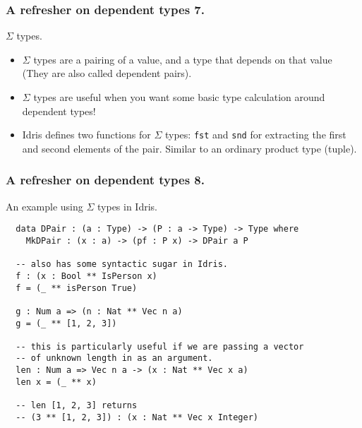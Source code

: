 \documentclass{beamer}
\begin{document}
\begin{frame}[fragile]
  \frametitle{A refresher on dependent types 7.}
  \begin{block}{$\Sigma$ types.}
  \begin{itemize}
    \item $\Sigma$ types are a pairing of a value, and a type that
            depends on that value (They are also called dependent
            pairs).
    \item $\Sigma$ types are useful when you want some basic type
            calculation around dependent types!
    \item Idris defines two functions for $\Sigma$ types:
          \texttt{fst} and \texttt{snd}
          for extracting the first and second elements of the pair.
          Similar to an ordinary product type (tuple).
  \end{itemize}
  \end{block}
\end{frame}

\begin{frame}[fragile]
  \frametitle{A refresher on dependent types 8.}
  \begin{block}{An example using $\Sigma$ types in Idris.}
  \begin{verbatim}
  data DPair : (a : Type) -> (P : a -> Type) -> Type where
    MkDPair : (x : a) -> (pf : P x) -> DPair a P

  -- also has some syntactic sugar in Idris.
  f : (x : Bool ** IsPerson x)
  f = (_ ** isPerson True)

  g : Num a => (n : Nat ** Vec n a)
  g = (_ ** [1, 2, 3])

  -- this is particularly useful if we are passing a vector
  -- of unknown length in as an argument.
  len : Num a => Vec n a -> (x : Nat ** Vec x a)
  len x = (_ ** x)

  -- len [1, 2, 3] returns
  -- (3 ** [1, 2, 3]) : (x : Nat ** Vec x Integer)
  \end{verbatim}
  \end{block}
\end{frame}
\end{document}

